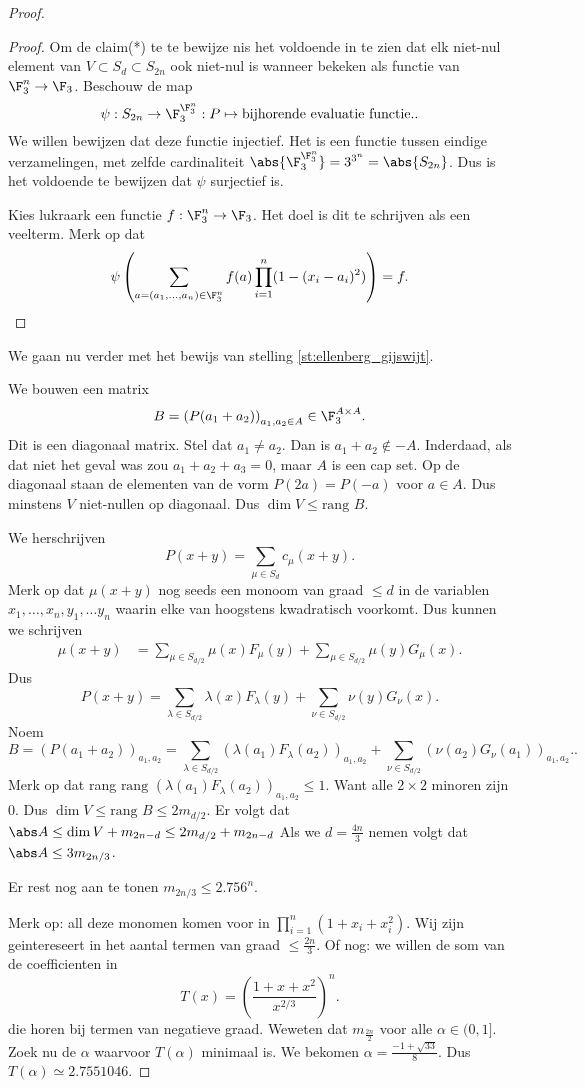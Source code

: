 \begin{proof}
\begin{proof}
	Om de claim(*) te te bewijze nis het voldoende in te zien dat elk niet-nul element van $V \subset S_d \subset S_{2n}$ ook niet-nul is wanneer bekeken als functie van $\F_3^{n} \to  \F_3$.   
	Beschouw de map \[
		\psi: S_{2n} \to \F_3^{\F_3^{n}}: P \mapsto  \text{bijhorende evaluatie functie.}
	.\] 
	We willen bewijzen dat deze functie injectief. Het is een functie tussen eindige verzamelingen, met zelfde cardinaliteit $\abs{\F_3^{\F_3^{n}}} = 3^{3^{n}} = \abs{S_{2n}}$. 
	Dus is het voldoende te bewijzen dat $\psi$ surjectief is.
	
	Kies lukraark een functie $f: \F_{3}^{n} \to \F_3$. Het doel is dit te schrijven als een veelterm.
	Merk op dat
	\begin{align*}
		\psi\left( \sum_{a = (a_1, \ldots, a_n) \in \F_3^{n}}f(a) \prod_{i = 1}^{n}(1 - (x_i - a_i)^2)\right)  = f
	.\end{align*}
\end{proof}
We gaan nu verder met het bewijs van stelling \ref{st:ellenberg_gijswijt}.

We bouwen een matrix
\[
	B = \left( P(a_1 + a_2) \right) _{a_1, a_2 \in A} \in \F_3^{A \times A}
.\] 
Dit is een diagonaal matrix.
Stel dat $a_1 \ne a_2$. Dan is $a_1 + a_2 \not\in -A$. Inderdaad, als dat niet het geval was zou $a_1 + a_2 + a_3 =0$, maar $A $ is een cap set. 
Op de diagonaal staan de elementen van de vorm $P(2a) = P(-a)$ voor $a \in A$. 
Dus minstens $V$ niet-nullen op diagonaal. 
Dus  $\dim V \le \text{rang }B$. 

We herschrijven \[
	P(x + y) = \sum_{\mu \in S_d}c_\mu (x + y)
.\] 
Merk op dat $\mu(x + y)$ nog seeds een monoom van graad $\le d$ in de variablen $x_1, \ldots, x_n, y_1,\ldots y_n$ waarin elke van hoogstens kwadratisch voorkomt. 
Dus kunnen we schrijven
\begin{align*}
	\mu(x + y) &= \sum_{\mu \in S_{d /2}} \mu(x)F_\mu(y) + \sum_{\mu \in S_{d / 2}} \mu(y) G_\mu(x)
.\end{align*}
Dus 
\[
	P(x + y) = \sum_{\lambda \in S_{d / 2}} \lambda(x) F_\lambda(y) + \sum_{\nu \in S_{d / 2}} \nu (y) G_\nu(x)
.\]  
Noem \[
	B = (P(a_1 + a_2))_{a_1, a_2} = \sum_{\lambda \in S_{d / 2}}(\lambda(a_1)F_\lambda(a_2))_{a_1, a_2} + \sum_{\nu \in S_{d /2 }} \left( \nu (a_2)G_\nu(a_1) \right) _{a_1, a_2}. 
.\] 
Merk op dat rang $\text{rang }(\lambda(a_1)F_\lambda(a_2))_{a_1, a_2}\le 1$.
Want alle $2 \times 2$ minoren zijn 0.
Dus $\dim V \le \text{rang }B \le 2m_{d / 2}$. 
Er volgt dat $\abs A \le \dim V + m_{2n - d} \le 2m_{d / 2} + m_{2n - d}$ 
Als we $d = \frac{4n}{3}$ nemen volgt dat $\abs A \le 3m_{2n / 3}$.

Er rest nog aan te tonen $m_{2n / 3} \le 2.756^{n}$.

Merk op: all deze monomen komen voor in $\prod_{i = 1}^{n}(1 + x_i + x^2_i)$. 
Wij zijn geintereseert in het aantal termen van graad $\le \frac{2n}{3}$. 
Of nog: we willen de som van de coefficienten in \[
	T(x) = \left( \frac{1 + x + x^2}{x^{2 /3 }} \right) ^{n}
.\] 
die horen bij termen van negatieve graad.
Weweten dat $m_{\frac{2n}{2}}$ voor alle $\alpha \in (0, 1]$. 
Zoek nu de  $\alpha$ waarvoor $T(\alpha)$ minimaal is.
We bekomen $\alpha = \frac{-1 + \sqrt{33} }{8}$. Dus $T(\alpha) \simeq 2.7551046$.
\end{proof}	
